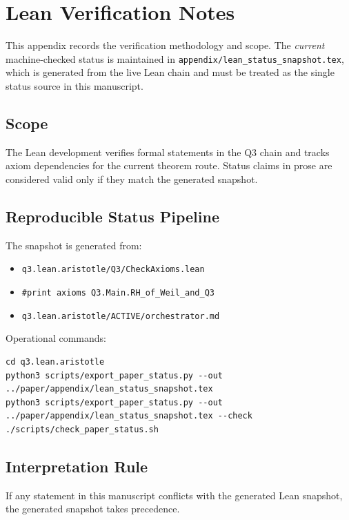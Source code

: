 
\section{Lean Verification Notes}
\label{app:lean}

This appendix records the verification methodology and scope.
The \emph{current} machine-checked status is maintained in
\texttt{appendix/lean\_status\_snapshot.tex}, which is generated from the live
Lean chain and must be treated as the single status source in this manuscript.

\subsection{Scope}

The Lean development verifies formal statements in the Q3 chain and tracks
axiom dependencies for the current theorem route. Status claims in prose are
considered valid only if they match the generated snapshot.

\subsection{Reproducible Status Pipeline}

The snapshot is generated from:
\begin{itemize}
  \item \texttt{q3.lean.aristotle/Q3/CheckAxioms.lean}
  \item \texttt{\#print axioms Q3.Main.RH\_of\_Weil\_and\_Q3}
  \item \texttt{q3.lean.aristotle/ACTIVE/orchestrator.md}
\end{itemize}

Operational commands:
\begin{verbatim}
cd q3.lean.aristotle
python3 scripts/export_paper_status.py --out ../paper/appendix/lean_status_snapshot.tex
python3 scripts/export_paper_status.py --out ../paper/appendix/lean_status_snapshot.tex --check
./scripts/check_paper_status.sh
\end{verbatim}

\subsection{Interpretation Rule}

If any statement in this manuscript conflicts with the generated Lean snapshot,
the generated snapshot takes precedence.
